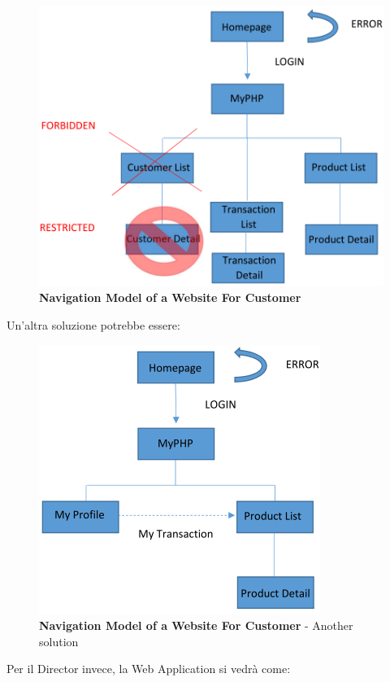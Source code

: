 \begin{center}
\begin{figure}[H]
\centering
\includegraphics[scale=1]{figures/plcd.png}
\caption{\textbf{Navigation Model of a Website For Customer}}
\end{figure}
\end{center}

Un’altra soluzione potrebbe essere: 

\begin{center}
\begin{figure}[H]
\centering
\includegraphics[scale=1]{figures/plcd2.png}
\caption{\textbf{Navigation Model of a Website For Customer} - Another solution}
\end{figure}
\end{center}

Per il Director invece, la Web Application si vedrà come: 

